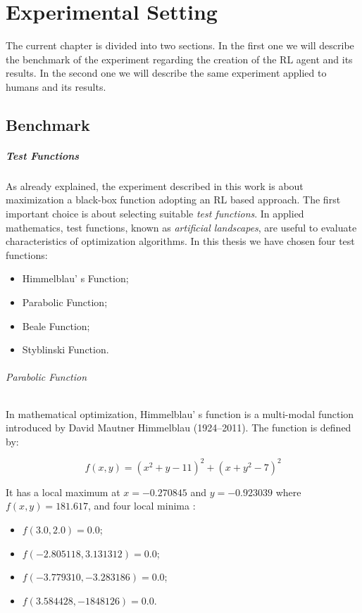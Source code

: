 \chapter{Experimental Setting}

The current chapter is divided into two sections. In the first one we will describe the benchmark of the experiment regarding the creation of the RL agent and its results. In the second one we will describe the same experiment applied to humans and its results.

\section{Benchmark}

\paragraph{Test Functions}

As already explained, the experiment described in this work is about maximization a black-box function adopting an RL based approach. The first important choice is about selecting suitable \textit{test functions}. In applied mathematics, test functions, known as \textit{artificial landscapes}, are useful to evaluate characteristics of optimization algorithms. In this thesis we have chosen four test functions:

\begin{itemize}
	\item Himmelblau' s Function;
	\item Parabolic Function;
	\item Beale Function;
	\item Styblinski Function.	
\end{itemize}

\subparagraph{Parabolic Function} In mathematical optimization, Himmelblau' s function is a multi-modal function introduced by David Mautner Himmelblau (1924–2011). The function is defined by: 

\begin{equation}
	f(x, y) = (x^2 + y -11)^2 + (x + y^2 - 7)^2
\end{equation}

It has a local maximum at $x = -0.270845$ and $y = -0.923039$ where $f(x, y) = 181.617$, and four local minima :

\begin{itemize}
	\item $f(3.0, 2.0) = 0.0$;
	\item $f(-2.805118, 3.131312) = 0.0$;
	\item $f(-3.779310, -3.283186) = 0.0$;
	\item $f(3.584428, -1848126) = 0.0$.
\end{itemize}
	
